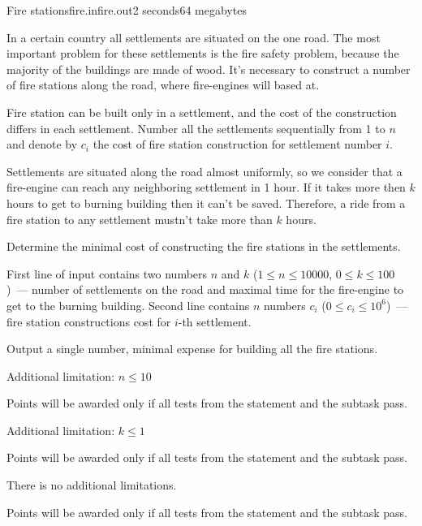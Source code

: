 \begin{problem}{Fire stations}{fire.in}{fire.out}{2 seconds}{64 megabytes}

In a certain country all settlements are situated on the one road. The most important problem for these settlements is the fire safety problem, because the majority of the buildings are made of wood. It's necessary to construct a number of fire stations along the road, where fire-engines will based at.

Fire station can be built only in a settlement, and the cost of the construction differs in each settlement. Number all the settlements sequentially from 1 to $n$ and denote by $c_i$ the cost of fire station construction for settlement number $i$. 

Settlements are situated along the road almost uniformly, so we consider that a fire-engine can reach any neighboring settlement in 1 hour. If it takes more then $k$ hours to get to burning building then it can't be saved. Therefore, a ride from a fire station to any settlement mustn't take more than $k$ hours.

Determine the minimal cost of constructing the fire stations in the settlements.

\InputFile
First line of input contains two numbers $n$ and $k$ ($1 \le n \le 10000$, $0 \le k \le 100$)~--- number of settlements on the road and maximal time for the fire-engine to get to the burning building.
Second line contains $n$ numbers $c_i$ ($0 \le c_i \le 10^{6}$)~--- fire station constructions cost for $i$-th settlement.

\OutputFile
Output a single number, minimal expense for building all the fire stations.

\Scoring
\SubtaskOne
Additional limitation:
$n \le 10$

Points will be awarded only if all tests from the statement and the subtask pass.

\SubtaskTwo
Additional limitation:
$k \le 1$

Points will be awarded only if all tests from the statement and the subtask pass.

\SubtaskThree
There is no additional limitations.

Points will be awarded only if all tests from the statement and the subtask pass.

\Examples

\begin{example}
%
%
\end{example}

\end{problem}

